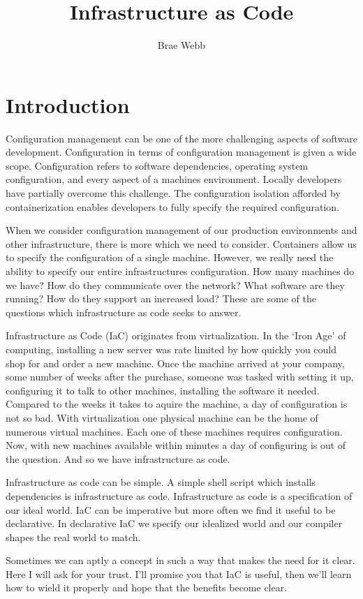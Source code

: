 \title{Infrastructure as Code}
\author{Brae Webb}
\date{}

\maketitle


\section{Introduction}
Configuration management can be one of the more challenging aspects of software development.
Configuration in terms of configuration management is given a wide scope.
Configuration refers to software dependencies, operating system configuration, and every aspect of a machines environment.
Locally developers have partially overcome this challenge.
The configuration isolation afforded by containerization enables developers to fully specify the required configuration.

When we consider configuration management of our production environments and other infrastructure,
there is more which we need to consider.
Containers allow us to specify the configuration of a single machine.
However, we really need the ability to specify our entire infrastructures configuration.
How many machines do we have?
How do they communicate over the network?
What software are they running?
How do they support an increased load?
These are some of the questions which infrastructure as code seeks to answer.

Infrastructure as Code (IaC) originates from virtualization.
In the `Iron Age' of computing, installing a new server was rate limited by how quickly you could shop for and order a new machine.
Once the machine arrived at your company, some number of weeks after the purchase,
someone was tasked with setting it up, configuring it to talk to other machines, installing the software it needed.
Compared to the weeks it takes to aquire the machine, a day of configuration is not so bad.
With virtualization one physical machine can be the home of numerous virtual machines.
Each one of these machines requires configuration.
Now, with new machines available within minutes a day of configuring is out of the question.
And so we have infrastructure as code.

Infrastructure as code can be simple.
A simple shell script which installs dependencies is infrastructure as code.
Infrastructure as code is a specification of our ideal world.
IaC can be imperative but more often we find it useful to be declarative.
In declarative IaC we specify our idealized world and our compiler shapes the real world to match.

Sometimes we can aptly a concept in such a way that makes the need for it clear.
Here I will ask for your trust.
I'll promise you that IaC is useful,
then we'll learn how to wield it properly and hope that the benefits become clear.
